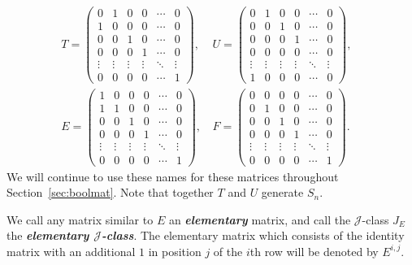 \documentclass[11pt]{article}
\newcommand{\defn}[1]{\textbf{\textit{#1}}}
\numberwithin{equation}{section}
\newcommand{\J}{\mathscr{J}}
\begin{document}
\begin{align*}
  T = \begin{pmatrix}
    0 & 1 & 0 & 0 & \cdots & 0 \\
    1 & 0 & 0 & 0 & \cdots & 0 \\
    0 & 0 & 1 & 0 & \cdots & 0 \\
    0 & 0 & 0 & 1 & \cdots & 0 \\
    \vdots  & \vdots & \vdots & \vdots & \ddots & \vdots\\
    0 & 0 & 0 & 0 & \cdots & 1 
  \end{pmatrix}\text{, }&
  U = \begin{pmatrix}
    0 & 1 & 0 & 0 & \cdots & 0 \\
    0 & 0 & 1 & 0 & \cdots & 0 \\
    0 & 0 & 0 & 1 & \cdots & 0 \\
    0 & 0 & 0 & 0 & \cdots & 0 \\
    \vdots  & \vdots & \vdots & \vdots & \ddots & \vdots\\
    1 & 0 & 0 & 0 & \cdots & 0 
  \end{pmatrix},&\\
  E = \begin{pmatrix}
    1 & 0 & 0 & 0 & \cdots & 0 \\
    1 & 1 & 0 & 0 & \cdots & 0 \\
    0 & 0 & 1 & 0 & \cdots & 0 \\
    0 & 0 & 0 & 1 & \cdots & 0 \\
    \vdots  & \vdots & \vdots & \vdots & \ddots & \vdots\\
    0 & 0 & 0 & 0 & \cdots & 1 
  \end{pmatrix}\text{, }&
  F = \begin{pmatrix}
    0 & 0 & 0 & 0 & \cdots & 0 \\
    0 & 1 & 0 & 0 & \cdots & 0 \\
    0 & 0 & 1 & 0 & \cdots & 0 \\
    0 & 0 & 0 & 1 & \cdots & 0 \\
    \vdots  & \vdots & \vdots & \vdots & \ddots & \vdots\\
    0 & 0 & 0 & 0 & \cdots & 1
  \end{pmatrix}.
\end{align*}
We will continue to use these names for these matrices throughout
Section~\ref{sec:boolmat}. Note that together $T$ and $U$ generate $S_n$.

We call any matrix similar to $E$ an \defn{elementary} matrix, and call the
$\J$-class $J_E$ the \defn{elementary $\J$-class}. The elementary matrix which
consists of the identity matrix with an additional $1$ in position $j$ of the
$i$th row will be denoted by $E^{i,j}$.
\end{document}
